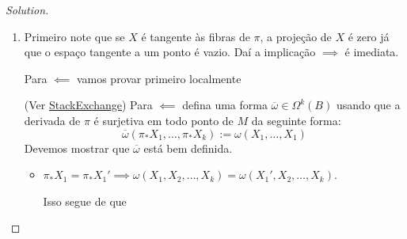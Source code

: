 \begin{proof}[Solution]\leavevmode
\begin{enumerate}[label=\alph*.]
	\item Primeiro note que se $X$ é tangente às fibras de $\pi$, a projeção de $X$ é zero já que o espaço tangente a um ponto é vazio. Daí a implicação $\implies $ é imediata.

	Para $\impliedby$ vamos provar primeiro localmente


	(Ver \href{https://math.stackexchange.com/questions/69658/basic-differential-forms}{StackExchange}) Para  $\impliedby$ defina uma forma $\overline{\omega}\in\Omega^{k}(B)$ usando que a derivada de $\pi$ é surjetiva em todo ponto de $M$ da seguinte forma:
	\[\overline{\omega}(\pi_*X_1,\ldots,\pi_*X_k):=\omega(X_1,\ldots,X_1)\]
Devemos mostrar que $\overline{\omega}$ está bem definida.

\begin{itemize}
\item {\color{persimmon}$\pi_*X_1=\pi_*X_1'\implies \omega(X_1,X_2,\ldots,X_k)=\omega(X_1',X_2,\ldots,X_k)$.}

	Isso segue de que 
\end{itemize}

\end{enumerate}	
\end{proof}


